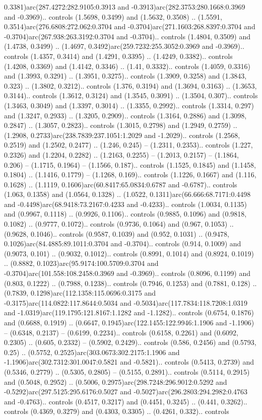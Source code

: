 0.3381)arc(287.4272:282.9105:0.3913 and -0.3913)arc(282.3753:280.1668:0.3969 and -0.3969).. controls (1.5698, 0.3499) and (1.5632, 0.3508) .. (1.5591, 0.3514)arc(276.6808:272.062:0.3704 and -0.3704)arc(271.1603:268.8397:0.3704 and -0.3704)arc(267.938:263.3192:0.3704 and -0.3704).. controls (1.4804, 0.3509) and (1.4738, 0.3499) .. (1.4697, 0.3492)arc(259.7232:255.3052:0.3969 and -0.3969).. controls (1.4357, 0.3414) and (1.4291, 0.3395) .. (1.4249, 0.3382).. controls (1.4208, 0.3369) and (1.4142, 0.3346) .. (1.41, 0.3332).. controls (1.4059, 0.3316) and (1.3993, 0.3291) .. (1.3951, 0.3275).. controls (1.3909, 0.3258) and (1.3843, 0.323) .. (1.3802, 0.3212).. controls (1.376, 0.3194) and (1.3694, 0.3163) .. (1.3653, 0.3144).. controls (1.3612, 0.3124) and (1.3545, 0.3091) .. (1.3504, 0.307).. controls (1.3463, 0.3049) and (1.3397, 0.3014) .. (1.3355, 0.2992).. controls (1.3314, 0.297) and (1.3247, 0.2933) .. (1.3205, 0.2909).. controls (1.3164, 0.2886) and (1.3098, 0.2847) .. (1.3057, 0.2823).. controls (1.3015, 0.2798) and (1.2949, 0.2759) .. (1.2908, 0.2733)arc(238.7839:237.1051:1.2029 and -1.2029).. controls (1.2568, 0.2519) and (1.2502, 0.2477) .. (1.246, 0.245) -- (1.2311, 0.2353).. controls (1.227, 0.2326) and (1.2204, 0.2282) .. (1.2163, 0.2255) -- (1.2013, 0.2157) -- (1.1864, 0.206) -- (1.1715, 0.1964) -- (1.1566, 0.187).. controls (1.1525, 0.1845) and (1.1458, 0.1804) .. (1.1416, 0.1779) -- (1.1268, 0.169).. controls (1.1226, 0.1667) and (1.116, 0.1628) .. (1.1119, 0.1606)arc(60.8417:65.0834:0.6787 and -0.6787).. controls (1.063, 0.1358) and (1.0564, 0.1328) .. (1.0522, 0.1311)arc(66.666:68.7171:0.4498 and -0.4498)arc(68.9418:73.2167:0.4233 and -0.4233).. controls (1.0034, 0.1135) and (0.9967, 0.1118) .. (0.9926, 0.1106).. controls (0.9885, 0.1096) and (0.9818, 0.1082) .. (0.9777, 0.1072).. controls (0.9736, 0.1064) and (0.967, 0.1053) .. (0.9628, 0.1046).. controls (0.9587, 0.1039) and (0.952, 0.1031) .. (0.9478, 0.1026)arc(84.4885:89.1011:0.3704 and -0.3704).. controls (0.914, 0.1009) and (0.9073, 0.101) .. (0.9032, 0.1012).. controls (0.8991, 0.1014) and (0.8924, 0.1019) .. (0.8882, 0.1023)arc(95.9174:100.5709:0.3704 and -0.3704)arc(101.558:108.2458:0.3969 and -0.3969).. controls (0.8096, 0.1199) and (0.803, 0.1222) .. (0.7988, 0.1238).. controls (0.7946, 0.1253) and (0.7881, 0.128) .. (0.7839, 0.1298)arc(112.1358:115.0696:0.3175 and -0.3175)arc(114.0822:117.8644:0.5034 and -0.5034)arc(117.7834:118.7208:1.0319 and -1.0319)arc(119.1795:121.8167:1.1282 and -1.1282).. controls (0.6754, 0.1876) and (0.6688, 0.1919) .. (0.6647, 0.1945)arc(122.1455:122.9946:1.1906 and -1.1906) -- (0.6348, 0.2137) -- (0.6199, 0.2234).. controls (0.6158, 0.2261) and (0.6092, 0.2305) .. (0.605, 0.2332) -- (0.5902, 0.2429).. controls (0.586, 0.2456) and (0.5793, 0.25) .. (0.5752, 0.2525)arc(303.0673:302.2175:1.1906 and -1.1906)arc(302.7312:301.0047:0.5821 and -0.5821).. controls (0.5413, 0.2739) and (0.5346, 0.2779) .. (0.5305, 0.2805) -- (0.5155, 0.2891).. controls (0.5114, 0.2915) and (0.5048, 0.2952) .. (0.5006, 0.2975)arc(298.7248:296.9012:0.5292 and -0.5292)arc(297.5125:295.6176:0.5027 and -0.5027)arc(296.2803:294.2982:0.4763 and -0.4763).. controls (0.4517, 0.3217) and (0.4451, 0.3245) .. (0.441, 0.3262).. controls (0.4369, 0.3279) and (0.4303, 0.3305) .. (0.4261, 0.332).. controls 